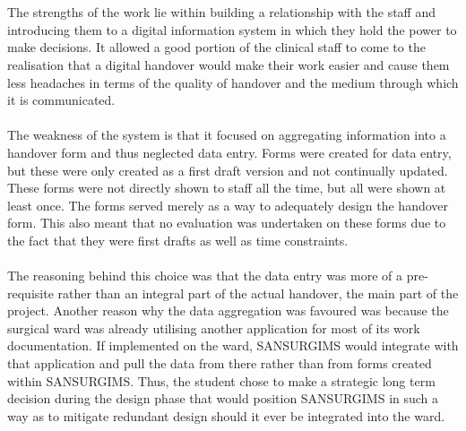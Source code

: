 \\ \\ 
The strengths of the work lie within building a relationship with the staff and introducing them to a digital information system in which they hold the power to make decisions. It allowed a good portion of the clinical staff to come to the realisation that a digital handover would make their work easier and cause them less headaches in terms of the quality of handover and the medium through which it is communicated. 
\\ \\
The weakness of the system is that it focused on aggregating information into a handover form and thus neglected data entry. Forms were created for data entry, but these were only created as a first draft version and not continually updated. These forms were not directly shown to staff all the time, but all were shown at least once. The forms served merely as a way to adequately design the handover form. This also meant that no evaluation was undertaken on these forms due to the fact that they were first drafts as well as time constraints. 
\\ \\
The reasoning behind this choice was that the data entry was more of a pre-requisite rather than an integral part of the actual handover, the main part of the project. Another reason why the data aggregation was favoured was because the surgical ward was already utilising another application for most of its work documentation. If implemented on the ward, SANSURGIMS would integrate with that application and pull the data from there rather than from forms created within SANSURGIMS. Thus, the student chose to make a strategic long term decision during the design phase that would position SANSURGIMS in such a way as to mitigate redundant design should it ever be integrated into the ward.
